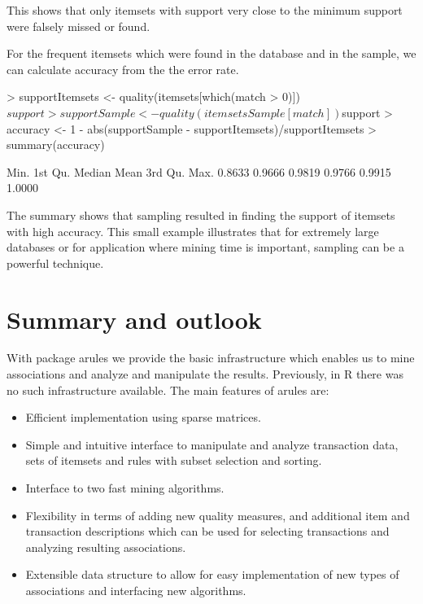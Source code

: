 \documentclass[10pt,a4paper]{article}
\newcommand{\strong}[1]{{\normalfont\fontseries{b}\selectfont #1}}
\newcommand{\pkg}[1]{\strong{#1}}
\newcommand{\proglang}[1]{\textsf{#1}}
\begin{document}
This shows that only itemsets with support very close to the minimum support
were falsely missed or found.

For the frequent itemsets which were found in the database and in the
sample, we can calculate accuracy from the the error rate.

\begin{Schunk}
\begin{Sinput}
> supportItemsets <- quality(itemsets[which(match > 0)])$support
> supportSample <- quality(itemsetsSample[match])$support
> accuracy <- 1 - abs(supportSample - supportItemsets)/supportItemsets
> summary(accuracy)
\end{Sinput}
\begin{Soutput}
   Min. 1st Qu.  Median    Mean 3rd Qu.    Max. 
 0.8633  0.9666  0.9819  0.9766  0.9915  1.0000 
\end{Soutput}
\end{Schunk}

The summary shows that sampling resulted in finding the support of itemsets
with high accuracy. This small example illustrates 
that for extremely large databases or for application where mining time 
is important, sampling can be a powerful technique.



\section{Summary and outlook\label{sec:conclusion}}

With package \pkg{arules} we
provide the basic infrastructure which enables us to 
mine associations and analyze and manipulate the results. 
Previously, in \proglang{R} there was no such infrastructure available.
The main features of \pkg{arules} are:

\begin{itemize}
 \item Efficient implementation using sparse matrices.
 \item Simple and intuitive interface to manipulate and analyze
  transaction data, sets of itemsets and rules with subset selection and
  sorting.
 \item Interface to two fast mining algorithms.
 \item Flexibility in terms of adding new quality measures, and
  additional item and transaction descriptions which can be used for
  selecting transactions and analyzing resulting associations.
 \item Extensible data structure to allow for easy implementation of new
  types of associations and interfacing new algorithms.
\end{itemize}
\end{document}
